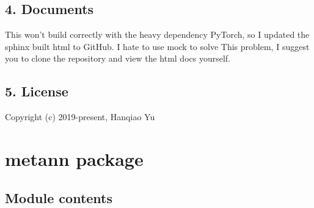 \documentclass[letterpaper,10pt,english]{sphinxmanual}
\begin{document}
\section{4. Documents}
\label{\detokenize{readme_link:documents}}

This won’t build correctly with the heavy dependency PyTorch, so I updated the sphinx built html to GitHub. I hate to use mock to solve This problem, I suggest you to clone the repository and view the html docs yourself.


\section{5. License}
\label{\detokenize{readme_link:license}}

Copyright (c) 2019-present, Hanqiao Yu


\chapter{metann package}
\label{\detokenize{metann:metann-package}}\label{\detokenize{metann::doc}}

\section{Module contents}
\label{\detokenize{metann:module-metann}}\label{\detokenize{metann:module-contents}}
\end{document}
